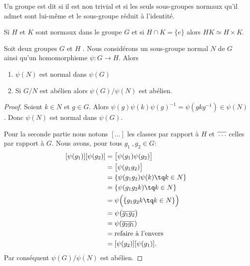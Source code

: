 \begin{definition}   \label{DefGroupeSimple}
    Un groupe est dit  si il est non trivial et si les seuls sous-groupes normaux qu'il admet sont lui-même et le sous-groupe réduit à l'identité.
\end{definition}

\begin{lemma}\label{LemHUkMxp}
    Si \( H\) et \( K\) sont normaux dans le groupe \( G\) et si \( H\cap K=\{ e \}\) alors \( HK\simeq H\times K\).
\end{lemma}

\begin{proposition} \label{PropSRMJooIDPBoW}
    Soit deux groupes \( G\) et \( H \) . Nous considérons un sous-groupe normal \( N\) de \( G\) ainsi qu'un homomorphisme \( \psi\colon G\to H\). Alors
    \begin{enumerate}
        \item
            \( \psi(N)\) est normal dans \( \psi(G)\)
        \item
            Si \( G/N\) est abélien alors \( \psi(G)/\psi(N)\) est abélien.
    \end{enumerate}
\end{proposition}

\begin{proof}
    Soient \( k\in N\) et \( g\in G\). Alors \( \psi(g)\psi(k)\psi(g)^{-1}=\psi(gkg^{-1})\in\psi(N)\). Donc \( \psi(N)\) est normal dans \( \psi(G)\).

    Pour la seconde partie nous notons \( [\ldots]\) les classes par rapport à \( H\) et \( \overline{ \vphantom{g}\ldots }\) celles par rapport à \( G\). Nous avons, pour tous \( g_1\ , g_2 \in G\):
    \begin{subequations}
        \begin{align}
            [\psi(g_1)][\psi(g_2)]&=\big[ \psi(g_1)\psi(g_2) \big]\\
            &=\big[ \psi(g_1g_2) \big]\\
            &=\{ \psi(g_1g_2)\psi(k)\tq k\in N \}\\
            &=\{ \psi(g_1g_2k)\tq k\in N \}\\
            &=\psi\Big(  \{ g_1g_2k\tq k\in N \}  \Big) \\
            &=\psi\big( \overline{ g_1g_2 } \big)\\
            &=\psi(\overline{ g_2g_1 })\\
            &=\text{refaire à l'envers}\\
            &=[\psi(g_2)][\psi(g_1)].
        \end{align}
    \end{subequations}
    Par conséquent \( \psi(G)/\psi(N)\) est abélien.
\end{proof}


